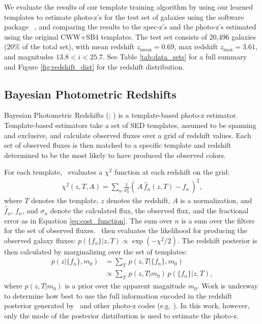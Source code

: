 
\label{sect:photoz}

We evaluate the results of our template training algorithm by using our learned templates to estimate photo-z's for the test set of galaxies using the software package \bpz\ \citep{Benitez2000a}, and comparing the results to the spec-z's and the photo-z's estimated using the original CWW+SB4 templates.
The test set consists of 20,496 galaxies (20\% of the total set), with mean redshift $z_\text{mean} = 0.69$, max redshift $z_\text{max} = 3.61$, and magnitudes $13.8 < i < 25.7$.
See Table \ref{tab:data_sets} for a full summary and Figure \ref{fig:redshift_dist} for the redshift distribution.

\subsection{Bayesian Photometric Redshifts}
\label{sect:bpz}

Bayesian Photometric Redshifts (\bpz; \citealt{Benitez2000a}) is a template-based photo-z estimator.
Template-based estimators take a set of SED templates, assumed to be spanning and exclusive, and calculate observed fluxes over a grid of redshift values. 
Each set of observed fluxes is then matched to a specific template and redshift determined to be the most likely to have produced the observed colors. 

For each template, \bpz\ evaluates a $\chi^2$ function at each redshift on the grid:
\begin{align}
    \chi^2 (z,T,A) = \sum_n \frac{1}{\sigma_n^2} (\, A \, \hat{f}_n(z,T) - f_n \,)^2,
    \label{eq:chi2}
\end{align}
where $T$ denotes the template, $z$ denotes the redshift, $A$ is a normalization, and $\hat{f}_n$, $f_n$, and $\sigma_n$ denote the calculated flux, the observed flux, and the fractional error as in Equation \ref{eq:cost_function}. 
The sum over $n$ is a sum over the filters for the set of observed fluxes. 
\bpz\ then evaluates the likelihood for producing the observed galaxy fluxes: $p(\{f_n\}|z,T) \propto \exp{(-\chi^2/2)}$. 
The redshift posterior is then calculated by marginalizing over the set of templates:
\begin{align}
    p(z|\{f_n\},m_0) &= \sum_T \, p(z,T|\{f_n\},m_0) \nonumber \\
                     &\propto \sum_T \, p(z,T|m_0) \, p(\{f_n\}|z,T),
\end{align}
where $p(z,T|m_0)$ is a prior over the apparent magnitude $m_0$. 
Work is underway to determine how best to use the full information encoded in the redshift posterior generated by \bpz\ and other photo-z codes (e.g. \citealt{Schmidt2020}). 
In this work, however, only the mode of the posterior distribution is used to estimate the photo-z.

